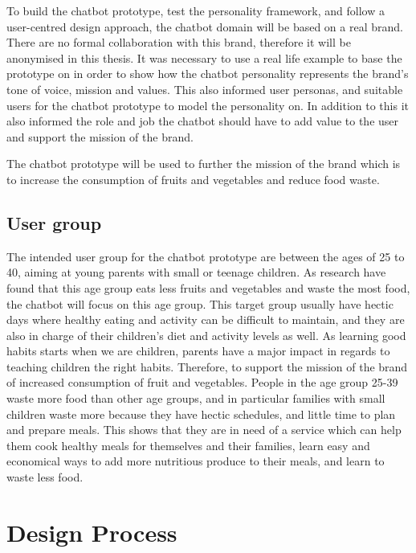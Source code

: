 To build the chatbot prototype, test the personality framework, and follow a user-centred design approach, the chatbot domain will be based on a real brand. There are no formal collaboration with this brand, therefore it will be anonymised in this thesis. It was necessary to use a real life example to base the prototype on in order to show how the chatbot personality represents the brand's tone of voice, mission and values. This also informed user personas, and suitable users for the chatbot prototype to model the personality on. In addition to this it also informed the role and job the chatbot should have to add value to the user and support the mission of the brand.

The chatbot prototype will be used to further the mission of the brand which is to increase the consumption of fruits and vegetables and reduce food waste. 


\subsection{User group}

The intended user group for the chatbot prototype are between the ages of 25 to 40, aiming at young parents with small or teenage children. As research have found that this age group eats less fruits and vegetables and waste the most food, the chatbot will focus on this age group. This target group usually have hectic days where healthy eating and activity can be difficult to maintain, and they are also in charge of their children’s diet and activity levels as well. As learning good habits starts when we are children, parents have a major impact in regards to teaching children the right habits. Therefore, to support the mission of the brand of increased consumption of fruit and vegetables. People in the age group 25-39 waste more food than other age groups, and in particular families with small children waste more because they have hectic schedules, and little time to plan and prepare meals. This shows that they are in need of a service which can help them cook healthy meals for themselves and their families, learn easy and economical ways to add more nutritious produce to their meals, and learn to waste less food.


\section{Design Process}

